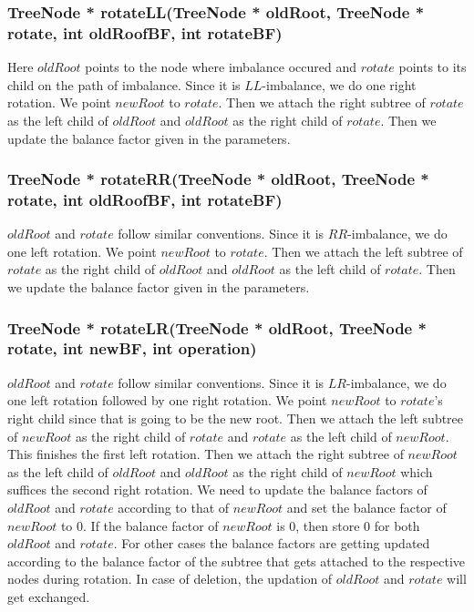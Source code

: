 \documentclass{article}
\begin{document}
\subsubsection{TreeNode * rotateLL(TreeNode * oldRoot, TreeNode * rotate, int oldRoofBF, int rotateBF)}
\label{LL}
Here $oldRoot$ points to the node where imbalance occured and $rotate$ points to its child on the path of imbalance. Since it is $LL$-imbalance, we do one right rotation. We point $newRoot$ to $rotate$. Then we attach the right subtree of $rotate$ as the left child of $oldRoot$ and $oldRoot$ as the right child of $rotate$. Then we update the balance factor given in the parameters.

\subsubsection{TreeNode * rotateRR(TreeNode * oldRoot, TreeNode * rotate, int oldRoofBF, int rotateBF)}
\label{RR}
$oldRoot$ and $rotate$ follow similar conventions. Since it is $RR$-imbalance, we do one left rotation. We point $newRoot$ to $rotate$. Then we attach the left subtree of $rotate$ as the right child of $oldRoot$ and $oldRoot$ as the left child of $rotate$. Then we update the balance factor given in the parameters. 

\subsubsection{TreeNode * rotateLR(TreeNode * oldRoot, TreeNode * rotate, int newBF, int operation)}
\label{LR}
$oldRoot$ and $rotate$ follow similar conventions. Since it is $LR$-imbalance, we do one left rotation followed by one right rotation. We point $newRoot$ to $rotate$'s right child since that is going to be the new root. Then we attach the left subtree of $newRoot$ as the right child of $rotate$ and $rotate$ as the left child of $newRoot$. This finishes the first left rotation. Then we attach the right subtree of $newRoot$ as the left child of $oldRoot$ and $oldRoot$ as the right child of $newRoot$ which suffices the second right rotation.\newline
We need to update the balance factors of $oldRoot$ and $rotate$ according to that of $newRoot$ and set the balance factor of $newRoot$ to $0$. If the balance factor of $newRoot$ is $0$, then store $0$ for both $oldRoot$ and $rotate$. For other cases the balance factors are getting updated according to the balance factor of the subtree that gets attached to the respective nodes during rotation. In case of deletion, the updation of $oldRoot$ and $rotate$ will get exchanged.
\end{document}
